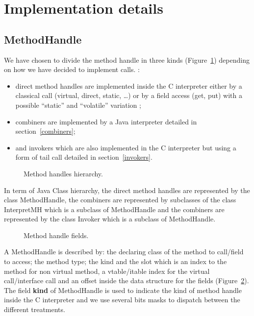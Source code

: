 \documentclass{sig-alternate}
\begin{document}
\section{Implementation details}
\label{implD}

    \subsection{MethodHandle}
      We have chosen to divide the method handle in three kinds (Figure~\ref{mhHier})
      depending on how we have decided to implement calls.
      :
      \begin{itemize}
        \item direct method handles are implemented inside the C interpreter
              either by a classical call (virtual, direct, static, \dots)
              or by a field access (get, put) with a possible ``static'' and ``volatile'' variation ;
        \item combiners are implemented by a Java interpreter detailed in section~\ref{combiners};
        \item and invokers which are also implemented in the C interpreter but using a form of tail call
              detailed in section~\ref{invokers}.
      \end{itemize}

      \begin{figure}[!ht]
        \centering \resizebox{\linewidth}{!}{}
        \caption{Method handles hierarchy.}
        \label{mhHier}
      \end{figure}

      In term of Java Class hierarchy, the direct method handles are represented by the class MethodHandle,
      the combiners are represented by subclasses of the class InterpretMH which is a subclass of MethodHandle
      and the combiners are represented by the class Invoker which is a subclass of MethodHandle.

      \begin{figure}[!ht]
        \centering \vspace{-1.5em}
        \caption{Method handle fields.}
        \label{mhFields}
      \end{figure}

      A MethodHandle is described by: the declaring class of the method to call/field to access;
      the method type; the kind and the slot which is an index to the method for non virtual method,
      a vtable/itable index for the virtual call/interface call and an offset inside the data structure
      for the fields (Figure~\ref{mhFields}).
      The field {\bf kind} of MethodHandle is used to indicate the kind of method handle inside the C interpreter and we use
      several bits masks to dispatch between the different treatments.
\end{document}
